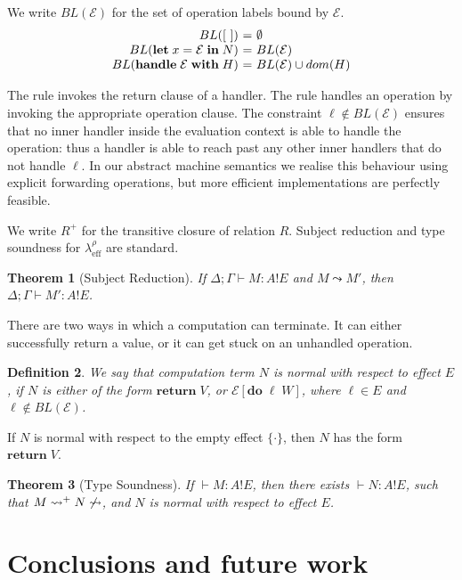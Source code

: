 \documentclass[mscres,icsa,lfcs,twoside,openright,logo,rightchapter,normalheadings]{infthesis}
\makeatletter
\newtheorem{theorem}{Theorem}[section]
\newtheorem{definition}[theorem]{Definition}
\theoremstyle{definition}
\newcommand{\Calc}{\ensuremath{\lambda_{\text{eff}}^\rho}\xspace}
\newcommand{\semlab}[1]{\text{\scshape{S-#1}}}
\newcommand{\keyw}[1]{\textbf{#1}}
\newcommand{\Handle}{\keyw{handle}}
\newcommand{\With}{\keyw{with}}
\newcommand{\Let}{\keyw{let}}
\newcommand{\In}{\keyw{in}}
\newcommand{\Do}{\keyw{do}}
\newcommand{\Return}{\keyw{return}}
\newcommand{\eff}{\mathbin{!}}
\newcommand{\typ}[3]{#1 \vdash #2 \eff #3}
\newcommand{\reducesto}[0]{\ensuremath{\leadsto}}
\newcommand{\ba}{\begin{array}}
\newcommand{\ea}{\end{array}}
\newenvironment{equations}{\[\ba{@{}r@{~}c@{~}l@{}}}{\ea\]\ignorespacesafterend}
\makeatother
\begin{document}
We write $BL(\mathcal{E})$ for the set of operation labels bound by
$\mathcal{E}$.
\begin{equations}
BL([~])                            &=& \emptyset \\
BL(\Let\;x=\mathcal{E}\;\In\;N)    &=& BL(\mathcal{E}) \\
BL(\Handle\;\mathcal{E}\;\With\;H) &=& BL(\mathcal{E}) \cup dom(H) \\
\end{equations}

The rule \semlab{Handle-Ret} invokes the return clause of a
handler. The rule \semlab{Handle-op} handles an operation by invoking
the appropriate operation clause. The constraint $\ell \notin
BL(\mathcal{E})$ ensures that no inner handler inside the evaluation
context is able to handle the operation: thus a handler is able to
reach past any other inner handlers that do not handle $\ell$. In our
abstract machine semantics we realise this behaviour using explicit
forwarding operations, but more efficient implementations are
perfectly feasible.


We write $R^+$ for the transitive closure of relation $R$.
%
Subject reduction and type soundness for $\Calc$ are standard.

\begin{theorem}[Subject Reduction]
If $\typ{\Delta;\Gamma}{M : A}{E}$ and $M \reducesto M'$, then
$\typ{\Delta;\Gamma}{M' : A}{E}$.
\end{theorem}

There are two ways in which a computation can terminate. It can either
successfully return a value, or it can get stuck on an unhandled
operation.
\begin{definition}
We say that computation term $N$ is normal with respect to effect $E$,
if $N$ is either of the form $\Return\;V$, or
$\mathcal{E}[\Do\;\ell\;W]$, where $\ell \in E$ and $\ell \notin
BL(\mathcal{E})$.
\end{definition}
If $N$ is normal with respect to the empty effect $\{\cdot\}$, then
$N$ has the form $\Return\;V$.

\begin{theorem}[Type Soundness]
If $\typ{}{M : A}{E}$, then there exists $\typ{}{N : A}{E}$, such that
$M \reducesto^+ N \not\reducesto$, and $N$ is normal with respect to
effect $E$.
\end{theorem}

\chapter{Conclusions and future work}
\end{document}
